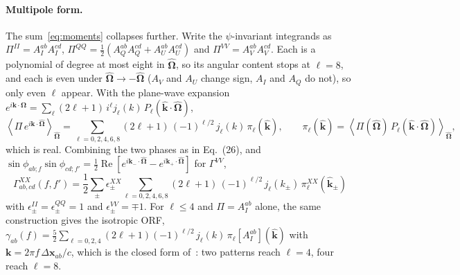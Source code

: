 \documentclass[11pt]{article}
\newcommand{\avg}[1]{\left\langle #1 \right\rangle}
\renewcommand{\Re}{\operatorname{Re}}
\newcommand{\bOmega}{\hat{\bm{\Omega}}}
\theoremstyle{remark}
\begin{document}
\paragraph{Multipole form.}
The sum~\eqref{eq:moments} collapses further. Write the $\psi$-invariant
integrands as
$\Pi^{II} = A_I^{ab}A_I^{cd}$,
$\Pi^{QQ} = \tfrac12(A_Q^{ab}A_Q^{cd} + A_U^{ab}A_U^{cd})$ and
$\Pi^{VV} = A_V^{ab}A_V^{cd}$. Each is a polynomial of degree at most eight in
$\bOmega$, so its angular content stops at $\ell = 8$, and each is even under
$\bOmega\to-\bOmega$ ($A_V$ and $A_U$ change sign, $A_I$ and $A_Q$ do not), so
only even $\ell$ appear. With the plane-wave expansion
$e^{i\bm k\cdot\bOmega} = \sum_\ell (2\ell+1)\, i^\ell j_\ell(k)\,
P_\ell(\hat{\bm k}\cdot\bOmega)$,
\begin{equation}
  \avg{\Pi\, e^{i\bm k\cdot\bOmega}}_{\bOmega}
  = \sum_{\ell = 0,2,4,6,8} (2\ell+1)\,(-1)^{\ell/2}\, j_\ell(k)\,
    \pi_\ell(\hat{\bm k}),
  \qquad
  \pi_\ell(\hat{\bm k}) = \avg{\Pi(\bOmega)\,
    P_\ell(\hat{\bm k}\cdot\bOmega)}_{\bOmega},
  \label{eq:multipole}
\end{equation}
which is real. Combining the two phases as in Eq.~(26), and
$\sin\phi_{ab;f}\sin\phi_{cd;f'} = \tfrac12\Re[e^{i\bm k_-\cdot\bOmega} -
e^{i\bm k_+\cdot\bOmega}]$ for $\Gamma^{VV}$,
\begin{equation}
  \boxed{\;
  \Gamma^{XX}_{ab,cd}(f,f') = \frac12 \sum_{\pm} \epsilon^{XX}_\pm
    \sum_{\ell = 0,2,4,6,8} (2\ell+1)\,(-1)^{\ell/2}\,
    j_\ell(k_\pm)\, \pi^{XX}_\ell(\hat{\bm k}_\pm)
  \;}
  \label{eq:two-pair-orf}
\end{equation}
with $\epsilon^{II}_\pm = \epsilon^{QQ}_\pm = 1$ and
$\epsilon^{VV}_\pm = \mp 1$.
For $\ell \le 4$ and $\Pi = A_I^{ab}$ alone, the same construction gives the
isotropic ORF,
$\gamma_{ab}(f) = \tfrac52 \sum_{\ell=0,2,4}(2\ell+1)(-1)^{\ell/2}\,
j_\ell(k)\, \pi_\ell[A_I^{ab}](\hat{\bm k})$ with
$\bm k = 2\pi f\,\Delta\bm x_{ab}/c$, which is the closed form
of~\cite{Flanagan1993}: two patterns reach $\ell = 4$, four reach $\ell = 8$.
\end{document}
